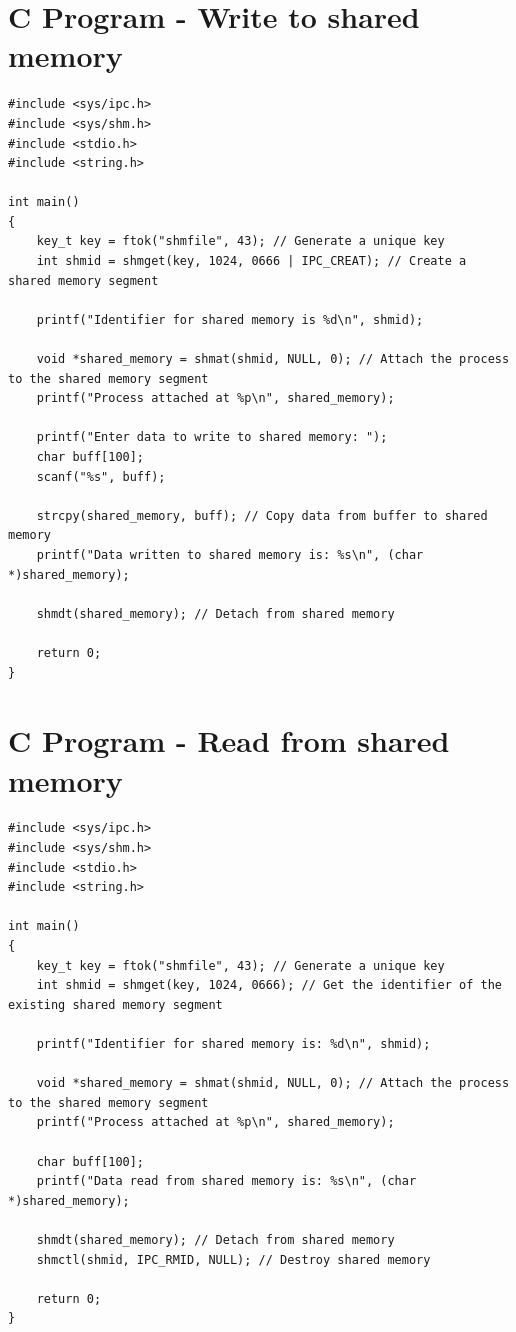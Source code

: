 \section{C Program - Write to shared memory}
\begin{lstlisting}[label={list:c_program:queue}]
#include <sys/ipc.h>
#include <sys/shm.h>
#include <stdio.h>
#include <string.h>

int main()
{
    key_t key = ftok("shmfile", 43); // Generate a unique key
    int shmid = shmget(key, 1024, 0666 | IPC_CREAT); // Create a shared memory segment

    printf("Identifier for shared memory is %d\n", shmid);

    void *shared_memory = shmat(shmid, NULL, 0); // Attach the process to the shared memory segment
    printf("Process attached at %p\n", shared_memory);

    printf("Enter data to write to shared memory: ");
    char buff[100];
    scanf("%s", buff);

    strcpy(shared_memory, buff); // Copy data from buffer to shared memory
    printf("Data written to shared memory is: %s\n", (char *)shared_memory);

    shmdt(shared_memory); // Detach from shared memory

    return 0;
}
\end{lstlisting}
\section{C Program - Read from shared memory}
\begin{lstlisting}[label={list:c_program:queue}]
#include <sys/ipc.h>
#include <sys/shm.h>
#include <stdio.h>
#include <string.h>

int main()
{
    key_t key = ftok("shmfile", 43); // Generate a unique key
    int shmid = shmget(key, 1024, 0666); // Get the identifier of the existing shared memory segment

    printf("Identifier for shared memory is: %d\n", shmid);

    void *shared_memory = shmat(shmid, NULL, 0); // Attach the process to the shared memory segment
    printf("Process attached at %p\n", shared_memory);

    char buff[100];
    printf("Data read from shared memory is: %s\n", (char *)shared_memory);

    shmdt(shared_memory); // Detach from shared memory
    shmctl(shmid, IPC_RMID, NULL); // Destroy shared memory

    return 0;
}
\end{lstlisting}

